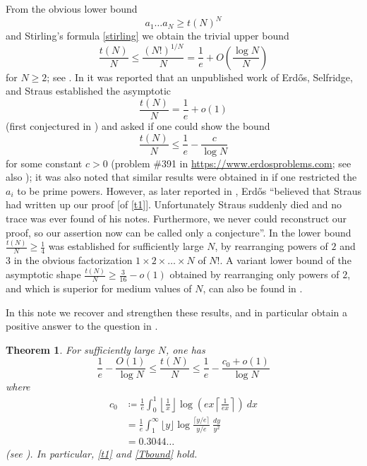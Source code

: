 \documentclass[12pt,a4paper,reqno]{amsart}
\numberwithin{equation}{section}
\theoremstyle{plain}
\newtheorem{theorem}{Theorem}[section]
\theoremstyle{definition}
\begin{document}
From the obvious lower bound
\begin{equation}\label{obvious}
  a_1 \dots a_N  \geq t(N)^N
\end{equation}
and Stirling's formula \eqref{stirling} we obtain the trivial upper bound
$$ \frac{t(N)}{N} \leq \frac{(N!)^{1/N}}{N} = \frac{1}{e} + O\left( \frac{\log N}{N}\right)$$
for $N \geq 2$; see .  In \cite[p.75]{erdos-graham} it was reported that an unpublished work of Erd\H{o}s, Selfridge, and Straus established the asymptotic
\begin{equation}\label{t1}
  \frac{t(N)}{N} = \frac{1}{e} + o(1)
\end{equation}
(first conjectured in \cite{erdos-71}) and asked if one could show the bound
\begin{equation}\label{Tbound}
   \frac{t(N)}{N} \leq \frac{1}{e} - \frac{c}{\log N}
\end{equation}
for some constant $c>0$ (problem {\#}391 in \url{https://www.erdosproblems.com}; see also \cite[Section B22, p. 122--123]{guy}); it was also noted that similar results were obtained in \cite{algr77} if one restricted the $a_i$ to be prime powers.  However, as later reported in \cite{erdos-96}, Erd\H{o}s ``believed that Straus had written up our proof [of \eqref{t1}]. Unfortunately Straus suddenly died and no trace was ever found of his notes. Furthermore, we never could reconstruct our proof, so our assertion now can be called only a conjecture''.   In \cite{guy} the lower bound $\frac{t(N)}{N} \geq \frac{1}{4}$ was established for sufficiently large $N$, by rearranging powers of $2$ and $3$ in the obvious factorization $1 \times 2 \times \dots \times N$ of $N!$.  A variant lower bound of the asymptotic shape $\frac{t(N)}{N} \geq \frac{3}{16}-o(1)$ obtained by rearranging only powers of $2$, and which is superior for medium values of $N$, can also be found in \cite{guy}.

In this note we recover and strengthen these results, and in particular obtain a positive answer to the question in \cite{erdos-graham}.

\begin{theorem}\label{main} For sufficiently large $N$, one has
  $$ \frac{1}{e} - \frac{O(1)}{\log N} \leq \frac{t(N)}{N} \leq \frac{1}{e} - \frac{c_0+o(1)}{\log N}$$
where
  \begin{align*}
    c_0 &\coloneqq \frac{1}{e} \int_0^1 \left \lfloor \frac{1}{x} \right\rfloor \log \left( ex \left \lceil \frac{1}{ex} \right\rceil \right)\ dx \\
    &= \frac{1}{e} \int_1^\infty \lfloor y \rfloor \log \frac{\lceil y/e \rceil}{y/e}\ \frac{dy}{y^2} \\
    &= 0.3044\dots
  \end{align*}
(see ).  In particular, \eqref{t1} and \eqref{Tbound} hold.
\end{theorem}
\end{document}
